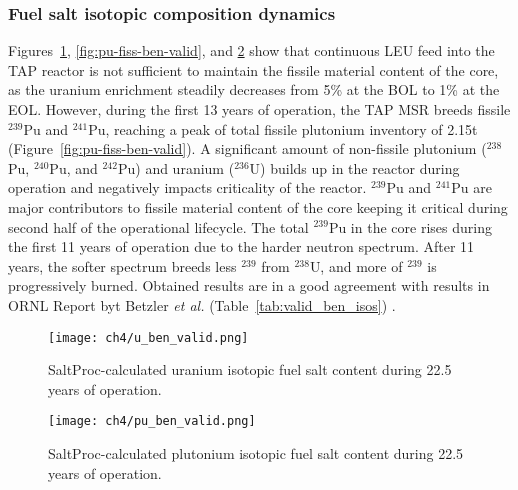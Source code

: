 \subsubsection{Fuel salt isotopic composition dynamics}
Figures~\ref{fig:u-ben-valid}, \ref{fig:pu-fiss-ben-valid}, and 
\ref{fig:pu-ben-valid} show that continuous \gls{LEU} feed into the \gls{TAP} 
reactor is not sufficient to maintain the fissile material content of the 
core, as the uranium enrichment steadily decreases from 5\% at the \gls{BOL} 
to 1\% at the \gls{EOL}. However, during the first 13 years of operation, 
the \gls{TAP} \gls{MSR} breeds fissile $^{239}$Pu and $^{241}$Pu, reaching a 
peak of total fissile plutonium inventory of 2.15t  
(Figure~\ref{fig:pu-fiss-ben-valid}). A significant amount of non-fissile 
plutonium ($^{238}$Pu, $^{240}$Pu, and $^{242}$Pu) and uranium ($^{236}$U) 
builds up in the reactor during operation and negatively impacts criticality 
of the reactor. $^{239}$Pu and $^{241}$Pu are major contributors to fissile 
material content of the core keeping it critical during second half of 
the operational lifecycle. The total $^{239}$Pu in the core rises during the 
first 11 years of operation due to the harder neutron spectrum. After 11 
years, the softer spectrum breeds less $^{239}$ from $^{238}$U, and more of 
$^{239}$ is progressively burned. Obtained results are in a good agreement 
with results in ORNL Report byt Betzler \emph{et al.} 
(Table~\ref{tab:valid_ben_isos}) \cite{betzler_assessment_2017-1}.

\begin{figure}[hbp!] %
	\centering
	\texttt{[image: ch4/u\_ben\_valid.png]}
	\caption{SaltProc-calculated uranium isotopic fuel salt content during 
	22.5 years of operation.}
	\label{fig:u-ben-valid}
\end{figure}
\begin{figure}[hbp!] %
	\centering
	\texttt{[image: ch4/pu\_ben\_valid.png]}
	\caption{SaltProc-calculated plutonium isotopic fuel salt content during 
		22.5 years of operation.}
	\label{fig:pu-ben-valid}
\end{figure}

